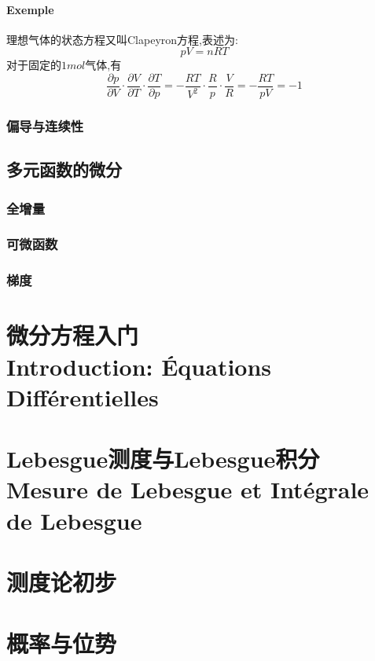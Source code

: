 \documentclass[12pt, a4paper, oneside]{ctexbook}
\begin{document}
  \subsubsection{Exemple}
  理想气体的状态方程又叫Clapeyron方程,表述为:
  $$
  pV=nRT
  $$
  对于固定的$1mol$气体,有
  $$
  \frac{\partial p}{\partial V}\cdot\frac{\partial V}{\partial T}\cdot\frac{\partial T}{\partial p}=-\frac{RT}{V^2}\cdot\frac{R}{p}\cdot\frac{V}{R}=-\frac{RT}{pV}=-1
  $$
  \subsection{偏导与连续性}





  \section{多元函数的微分}
  \subsection{全增量}
  \subsection{可微函数}
  \subsection{梯度}
  \chapter{微分方程入门\\Introduction: Équations Différentielles}
  \chapter{Lebesgue测度与Lebesgue积分\\ Mesure de Lebesgue et Intégrale de Lebesgue}
  \chapter{测度论初步}
  \chapter{概率与位势}  
\end{document}
